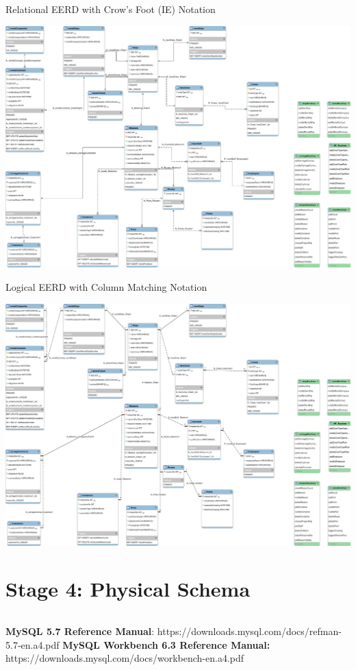 \documentclass[10pt]{report}
\begin{document}
\begin{inlinefigure}{Relational EERD with Crow's Foot (IE) Notation}
	\begin{center}
		\includegraphics[height=\textheight, width=\textwidth]{MercantileShips-EER.pdf}
	\end{center}
\end{inlinefigure}
\newpage
\begin{inlinefigure}{Logical EERD with Column Matching Notation }
	\begin{center}
		\includegraphics[height=\textheight, width=\textwidth]{MercantileShips-EER-Column.pdf}
	\end{center}
\end{inlinefigure}


\newpage
\chapter*{Stage 4: Physical Schema}
\inputminted[breaklines=true, fontsize=\footnotesize]{mysql}{../src/NavibusMercatoriis.sql}
\newpage
\begin{thebibliography}{}
		\textbf{MySQL 5.7 Reference Manual}: https://downloads.mysql.com/docs/refman-5.7-en.a4.pdf
		\textbf{MySQL Workbench 6.3 Reference Manual:} https://downloads.mysql.com/docs/workbench-en.a4.pdf
\end{thebibliography}
\end{document}
